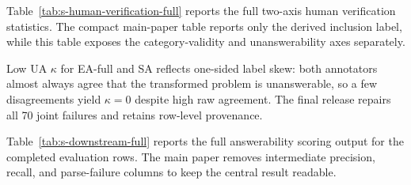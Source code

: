 \documentclass[10pt]{article}
\begin{document}
Table~\ref{tab:s-human-verification-full} reports the full two-axis human verification statistics. The compact main-paper table reports only the derived inclusion label, while this table exposes the category-validity and unanswerability axes separately.

\begin{table}[!t]
\centering
\small
\caption{Detailed human verification by category and axis.}
\label{tab:s-human-verification-full}
\vspace{2pt}
\footnotesize{Low UA $\kappa$ for EA-full and SA reflects one-sided label skew: both annotators almost always agree that the transformed problem is unanswerable, so a few disagreements yield $\kappa=0$ despite high raw agreement. The final release repairs all 70 joint failures and retains row-level provenance.}
\end{table}

Table~\ref{tab:s-downstream-full} reports the full answerability scoring output for the completed evaluation rows. The main paper removes intermediate precision, recall, and parse-failure columns to keep the central result readable.
\end{document}
